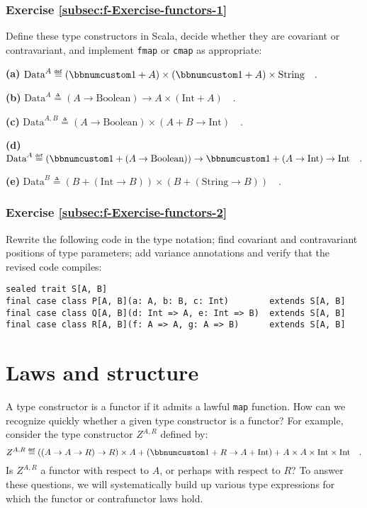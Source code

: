 \subsubsection{Exercise \label{subsec:f-Exercise-functors-1}\ref{subsec:f-Exercise-functors-1}}

Define these type constructors in Scala, decide whether they are covariant
or contravariant, and implement \lstinline!fmap! or \lstinline!cmap!
as appropriate:

\textbf{(a)} $\text{Data}^{A}\triangleq\left(\bbnum 1+A\right)\times\left(\bbnum 1+A\right)\times\text{String}\quad.$

\textbf{(b)} $\text{Data}^{A}\triangleq(A\rightarrow\text{Boolean})\rightarrow A\times\left(\text{Int}+A\right)\quad.$

\textbf{(c)} $\text{Data}^{A,B}\triangleq(A\rightarrow\text{Boolean})\times\left(A+B\rightarrow\text{Int}\right)\quad.$

\textbf{(d)} $\text{Data}^{A}\triangleq(\bbnum 1+(A\rightarrow\text{Boolean}))\rightarrow\bbnum 1+(A\rightarrow\text{Int})\rightarrow\text{Int}\quad.$

\textbf{(e)} $\text{Data}^{B}\triangleq(B+(\text{Int}\rightarrow B))\times(B+(\text{String}\rightarrow B))\quad.$

\subsubsection{Exercise \label{subsec:f-Exercise-functors-2}\ref{subsec:f-Exercise-functors-2}}

Rewrite the following code in the type notation; find covariant and
contravariant positions of type parameters; add variance annotations
and verify that the revised code compiles:

\begin{lstlisting}
sealed trait S[A, B]
final case class P[A, B](a: A, b: B, c: Int)        extends S[A, B]
final case class Q[A, B](d: Int => A, e: Int => B)  extends S[A, B]
final case class R[A, B](f: A => A, g: A => B)      extends S[A, B]
\end{lstlisting}


\section{Laws and structure\label{sec:f-Laws-and-structure}}

A type constructor is a functor if it admits a lawful \lstinline!map!
function. How can we recognize quickly whether a given type constructor
is a functor? For example, consider the type constructor $Z^{A,R}$
defined by: 
\begin{equation}
Z^{A,R}\triangleq\left(\left(A\rightarrow A\rightarrow R\right)\rightarrow R\right)\times A+\left(\bbnum 1+R\rightarrow A+\text{Int}\right)+A\times A\times\text{Int}\times\text{Int}\quad.\label{eq:f-example-complicated-z}
\end{equation}
Is $Z^{A,R}$ a functor with respect to $A$, or perhaps with respect
to $R$? To answer these questions, we will systematically build up
various type expressions for which the functor or contrafunctor laws
hold. 

